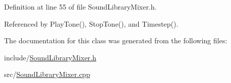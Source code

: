 Definition at line 55 of file Sound\+Library\+Mixer.\+h.



Referenced by Play\+Tone(), Stop\+Tone(), and Timestep().



The documentation for this class was generated from the following files\+:\begin{DoxyCompactItemize}
\item 
include/\hyperlink{SoundLibraryMixer_8h}{Sound\+Library\+Mixer.\+h}\item 
src/\hyperlink{SoundLibraryMixer_8cpp}{Sound\+Library\+Mixer.\+cpp}\end{DoxyCompactItemize}
